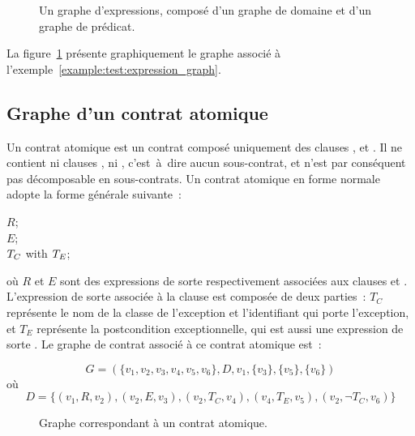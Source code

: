 \begin{figure}


\caption{\label{figure:test:expression_graph} Un graphe d'expressions, composé
d'un graphe de domaine et d'un graphe de prédicat.}

\end{figure}

La figure~\ref{figure:test:expression_graph} présente graphiquement le graphe
associé à l'exemple~\ref{example:test:expression_graph}.

\subsection{Graphe d'un contrat atomique}
\label{subsection:test:atomic_graph}

Un {\strong contrat atomique} est un contrat composé uniquement des clauses
\arequires, \aensures et \athrowable. Il ne contient ni clauses \abehavior, ni
\adefault, c'est~à~dire aucun sous-contrat, et n'est par conséquent pas
décomposable en sous-contrats. Un contrat atomique en forme normale adopte
la forme générale suivante~:
%
\begin{pre}
\arequires  \(R\); \\
\aensures   \(E\); \\
\athrowable \(T\sb{C}\) with \(T\sb{E}\);
\end{pre}
%
où $R$ et $E$ sont des expressions de sorte  respectivement
associées aux clauses \arequires et \aensures. L'expression de sorte
 associée à la clause \athrowable est composée de
deux parties~: $T_C$ représente le nom de la classe de l'exception et
l'identifiant qui porte l'exception, et $T_E$ représente la postcondition
exceptionnelle, qui est aussi une expression de sorte . Le
graphe de contrat associé à ce contrat atomique est~:

$$G = (
  \{v_1, v_2, v_3, v_4, v_5, v_6\},
  D,
  v_1,
  \{v_3\},
  \{v_5\},
  \{v_6\}
)$$
%
où
%
$$D = \{
  (v_1, R, v_2),
  (v_2, E, v_3),
  (v_2, T_C, v_4),
  (v_4, T_E, v_5),
  (v_2, \neg T_C, v_6)
\}$$

\begin{figure}


\caption{\label{figure:test:atomic_graph} Graphe correspondant à un contrat
atomique.}

\end{figure}

